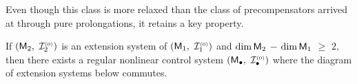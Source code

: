 \documentclass[a4paper]{ifacconf}
\begin{document}
%
Even though this class is more relaxed than the class of precompensators arrived at through pure prolongations, it retains a key property.
%
\begin{thm}
  \label{thm:DFL-LSOP}
  If \((\mathsf{M}_2,\) \(\mathcal{I}^{\smash{\scriptscriptstyle(0)}}_2)\) is an extension system of \((\mathsf{M}_1,\) \(\mathcal{I}^{\smash{\scriptscriptstyle(0)}}_1)\) and \(\operatorname{dim} \mathsf{M}_2\) \(-\) \(\operatorname{dim} \mathsf{M}_1\) \(\geq\) \(2,\) then there exists a regular nonlinear control system \((\mathsf{M}_\bullet,\) \(\mathcal{I}^{\smash{\scriptscriptstyle(0)}}_\bullet)\) where the diagram of extension systems below commutes.
  \begin{center}
  \end{center}
\end{thm}
%
\end{document}
